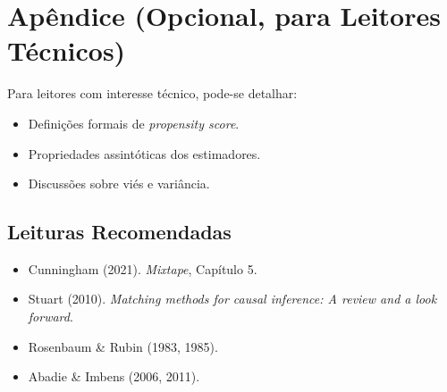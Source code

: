 \documentclass[12pt]{article}
\begin{document}
\section*{Apêndice (Opcional, para Leitores Técnicos)}
Para leitores com interesse técnico, pode-se detalhar:
\begin{itemize}[topsep=2pt,itemsep=2pt]
    \item Definições formais de \textit{propensity score}.
    \item Propriedades assintóticas dos estimadores.
    \item Discussões sobre viés e variância.
\end{itemize}

\subsection*{Leituras Recomendadas}
\begin{itemize}[topsep=2pt,itemsep=2pt]
    \item Cunningham (2021). \textit{Mixtape}, Capítulo 5.
    \item Stuart (2010). \textit{Matching methods for causal inference: A review and a look forward}.
    \item Rosenbaum \& Rubin (1983, 1985).
    \item Abadie \& Imbens (2006, 2011).
\end{itemize}
\end{document}
